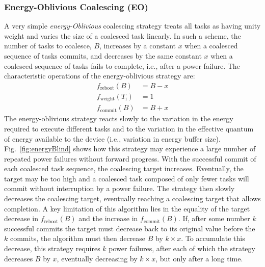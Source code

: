 \subsubsection{Energy-Oblivious Coalescing (EO)}
\label{subsec:energyBlind}
% 
A very simple {\em energy-Oblivious} coalescing strategy treats all tasks as
having unity weight and varies the size of a coalesced task linearly. In such a
scheme, the number of tasks to coalesce, $B$, increases by a constant $x$ when
a coalesced sequence of tasks commits, and decreases by the same constant $x$
when a coalesced sequence of tasks fails to complete, i.e., after a power
failure. The characteristic operations of the energy-oblivious strategy are: 
%
\begin{equation}
	\begin{split}
		f_\text{reboot}(B)  		&	 = B - x \\
		f_\text{weight}(T_\text{i}) & 	 =  1 \\
		f_\text{commit}(B) 			& 	 = B + x
	\end{split}
\end{equation}
%
The energy-oblivious strategy reacts slowly to the variation in the energy
required to execute different tasks and to the variation in the effective quantum of
energy available to the device (i.e., variation in energy buffer size). 
%
Fig.~\ref{fig:energyBlind} shows how this strategy may experience a 
large number of repeated power failures without forward progress.
%
With the successful commit of each coalesced task sequence, the coalescing
target increases.  Eventually, the target may be too high and a coalesced task
composed of only fewer tasks will commit without interruption by a power
failure.
%
The strategy then slowly decreases the coalescing target, eventually reaching a
coalescing target that allows completion.
%
A key limitation of this algorithm lies in the equality of the target decrease
in $f_\text{reboot}(B)$ and the increase in $f_\text{commit}(B)$.  If, after
some number $k$ successful commits the target must decrease back to its
original value before the $k$ commits, the algorithm must then decrease $B$ by
$k \times x$.  To accumulate this decrease, this strategy requires $k$ power
failures, after each of which the strategy decreases $B$ by $x$, eventually
decreasing by $k \times x$, but only after a long time. 
%
